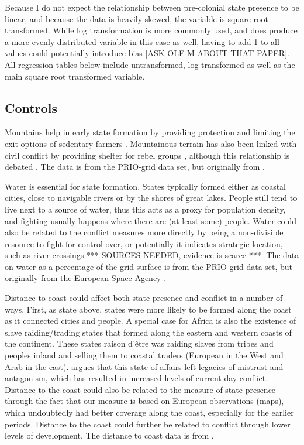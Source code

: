 \documentclass[12pt]{article}
\begin{document}
Because I do not expect the relationship between pre-colonial state presence to
be linear, and because the data is heavily skewed, the variable is square root
transformed. While log transformation is more commonly used, and does produce a
more evenly distributed variable in this case as well, having to add 1 to
all values could potentially introduce bias [ASK OLE M ABOUT THAT PAPER]. All
regression tables below include untransformed, log transformed as well as the
main square root transformed variable.

\subsection{Controls}

Mountains help in early state formation by providing protection and limiting the
exit options of sedentary farmers \citep{Carneiro1988}. Mountainous terrain has
also been linked with civil conflict by providing shelter for rebel groups
\citep{Hegre2006}, although this relationship is debated 
\citep{Buhaug2002}. The data is from the PRIO-grid data set, but originally 
from \citet{Blyth2002}. 

Water is essential for state formation. States typically formed either as
coastal cities, close to navigable rivers or by the shores of great lakes.
People still tend to live next to a source of water, thus this acts as a proxy
for population density, and fighting usually happens where there are (at least
some) people.  Water could also be related to the conflict measures more
directly by being a non-divisible resource to fight for control over, or
potentially it indicates strategic location, such as river crossings *** SOURCES
NEEDED, evidence is scarce ***. The data on water as a percentage of the grid
surface is from the PRIO-grid data set, but originally from the European Space
Agency \citep{Bontemps2009}.

Distance to coast could affect both state presence and conflict in a number of
ways. First, as state above, states were more likely to be formed along the
coast as it connected cities and people. A special case for Africa is also the
existence of slave raiding/trading states that formed along the eastern and
western coasts of the continent. These states raison d'être was raiding slaves
from tribes and peoples inland and selling them to coastal traders (European in
the West and Arab in the east). \citet{Nunn2008} argues that this state of
affairs left legacies of mistrust and antagonism, which has resulted in
increased levels of current day conflict. Distance to the coast could also be
related to the measure of state presence through the fact that our measure is
based on European observations (maps), which undoubtedly had better coverage
along the coast, especially for the earlier periods. Distance to the coast could
further be related to conflict through lower levels of development. The distance
to coast data is from \citet{Wessel1996}.
\end{document}
